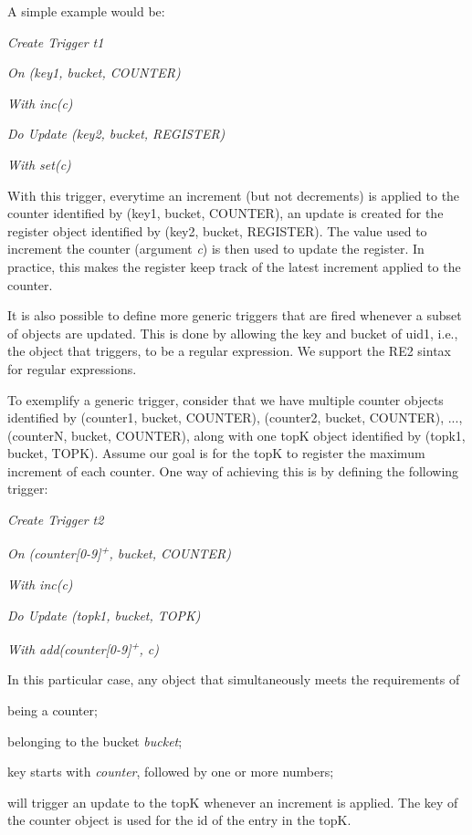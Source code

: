\documentclass{vldb}
\newcommand{\emphvspace}{0.5\baselineskip}
\newcommand{\firstblockemph}[1]{\vspace{\emphvspace}\hspace{2em}\emph{#1}}
\newcommand{\middleblockemph}[1]{\hspace{2em}\emph{#1}}
\newcommand{\lastblockemph}[1]{\hspace{2em}\emph{#1}\vspace{\emphvspace}}
\begin{document}
A simple example would be:

\firstblockemph{Create Trigger t1}

\middleblockemph{On (key1, bucket, COUNTER)}

\middleblockemph{With inc(c)}

\middleblockemph{Do Update (key2, bucket, REGISTER)}

\lastblockemph{With set(c)}

With this trigger, everytime an increment (but not decrements) is applied to the counter identified by (key1, bucket, COUNTER), an update is created for the register object identified by (key2, bucket, REGISTER).
The value used to increment the counter (argument \emph{c}) is then used to update the register.
In practice, this makes the register keep track of the latest increment applied to the counter.

It is also possible to define more generic triggers that are fired whenever a subset of objects are updated.
This is done by allowing the key and bucket of uid1, i.e., the object that triggers, to be a regular expression.
We support the RE2 \cite{RE2sintax} sintax for regular expressions.

To exemplify a generic trigger, consider that we have multiple counter objects identified by (counter1, bucket, COUNTER), (counter2, bucket, COUNTER), ..., (counterN, bucket, COUNTER), along with one topK object identified by (topk1, bucket, TOPK).
Assume our goal is for the topK to register the maximum increment of each counter.
One way of achieving this is by defining the following trigger:

\firstblockemph{Create Trigger t2}

\middleblockemph{On (counter[0-9]\textsuperscript{+}, bucket, COUNTER)}

\middleblockemph{With inc(c)}

\middleblockemph{Do Update (topk1, bucket, TOPK)}

\lastblockemph{With add(counter[0-9]\textsuperscript{+}, c)}

In this particular case, any object that simultaneously meets the requirements of
\begin{enumerate*}[label=(\roman*)] 
	\item being a counter; 
	\item belonging to the bucket \emph{bucket};
	\item key starts with \emph{counter}, followed by one or more numbers;
\end{enumerate*}
will trigger an update to the topK whenever an increment is applied.
The key of the counter object is used for the id of the entry in the topK.
\end{document}
